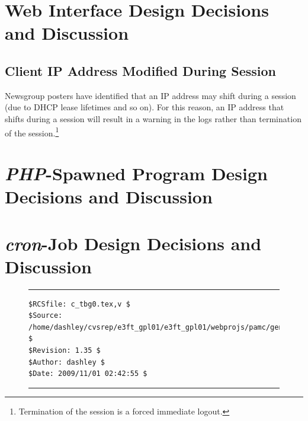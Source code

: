 \section{Web Interface Design Decisions and Discussion}
\label{ctbg0:swid0}


\subsection{Client IP Address Modified During Session}
\label{ctbg0:swid0:sipa0}

Newsgroup posters have identified that an IP address may shift during a
session (due to DHCP lease lifetimes and so on).  For this reason, an
IP address that shifts during a session will result in a warning in the
logs rather than termination of the session.\footnote{Termination of the
session is a forced immediate logout.}


\section{\emph{PHP}-Spawned Program Design Decisions and Discussion}
\label{ctbg0:sphs0}


\section{\emph{cron}-Job Design Decisions and Discussion}
\label{ctbg0:scjd0}


\noindent\begin{figure}[!b]
\noindent\rule[-0.25in]{\textwidth}{1pt}
\begin{tiny}
\begin{verbatim}
$RCSfile: c_tbg0.tex,v $
$Source: /home/dashley/cvsrep/e3ft_gpl01/e3ft_gpl01/webprojs/pamc/gen_a/docs/manual/man_a/c_tbg0/c_tbg0.tex,v $
$Revision: 1.35 $
$Author: dashley $
$Date: 2009/11/01 02:42:55 $
\end{verbatim}
\end{tiny}
\noindent\rule[0.25in]{\textwidth}{1pt}
\end{figure}

